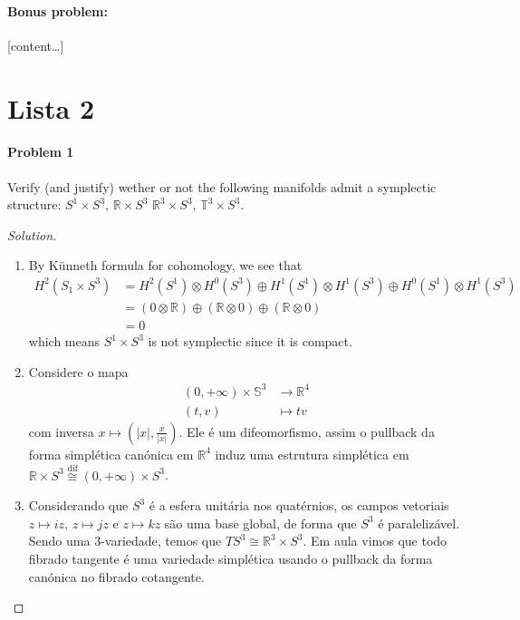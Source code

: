 \paragraph{Bonus problem: } [content…]

\section{Lista 2}
\paragraph{Problem 1} Verify (and justify) wether or not the following manifolds admit a symplectic structure: $S^{1}\times S^3$, $\mathbb{R}\times S^3$ $\mathbb{R}^{3}\times S^{3}$, $\mathbb{T}^3\times S^3$.

\begin{proof}[Solution]\leavevmode
	\begin{enumerate}[label=\alph*.]
		\item By K\"unneth formula for cohomology, we see that
			\begin{align*}
				H^{2}(S_1\times S^3)&=H^{2}(S^1)\otimes H^{0}(S^3)\oplus H^{1}(S^1)\otimes H^{1}(S^3)\oplus H^{0}(S^1)\otimes H^{1}(S^3)\\
				&=(0\otimes  \mathbb{R})\oplus (\mathbb{R}\otimes 0)\oplus (\mathbb{R}\otimes 0)\\
				&=0
			\end{align*}
		which means $S^1\times S^3$ is not symplectic since it is compact.

		\item Considere o mapa
			\begin{align*}
				(0,+\infty)\times \mathbb{S}^3 &\longrightarrow \mathbb{R}^4 \\
				(t,v) &\longmapsto tv
			\end{align*}
			com inversa $x\mapsto \left( |x|,\frac{x}{|x|} \right)$. Ele \'e um difeomorfismo, assim o pullback da forma simpl\'etica can\'onica em $\mathbb{R}^{4}$ induz uma estrutura simpl\'etica em $\mathbb{R}\times S^3\overset{\operatorname{dif}}{\cong} (0,+\infty)\times S^3$.

		\item Considerando que $S^3$ \'e a esfera unit\'aria nos quat\'ernios, os campos vetoriais $z\mapsto iz$, $z\mapsto jz$ e $z\mapsto kz$ s\~ao uma base global, de forma que $S^3$ \'e paraleliz\'avel. Sendo uma 3-variedade, temos que $TS^3\cong \mathbb{R}^{3}\times S^3$. Em aula vimos que todo fibrado tangente \'e uma variedade simpl\'etica usando o pullback da forma can\'onica no fibrado cotangente.


\end{enumerate}
\end{proof}
